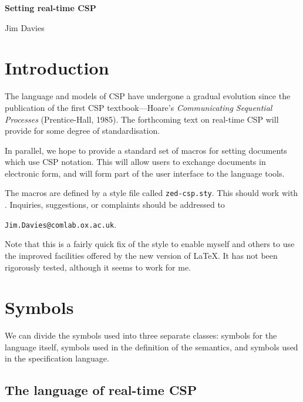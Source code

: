 \documentclass[12pt]{article}
\begin{document}
 \thispagestyle{empty}

\def\AMS{%
   $\cal{A}$
   \kern-.5em\lower.5ex\hbox{$\cal{M}$}\kern-.125em$\cal{S}$}

\parindent 0pt
\parskip 10pt

{\huge\bf Setting real-time CSP}

\vskip 2mm

{\Large Jim Davies}

\vskip 8mm


\section{Introduction}

The language and models of CSP have undergone a gradual evolution
since the publication of the first CSP textbook---Hoare's {\sl
Communicating Sequential Processes\/} (Prentice-Hall, 1985).  The
forthcoming text on real-time CSP will provide for some
degree of standardisation.  

In parallel, we hope to provide a standard set of macros for setting
documents which use CSP notation.  This will allow users to exchange
documents in electronic form, and will form part of the user interface
to the language tools.

The macros are defined by a style file called \verb|zed-csp.sty|.
This should work with \LaTeXe.  Inquiries, suggestions, or complaints
should be addressed to 

\begin{center}
  {\tt Jim.Davies@comlab.ox.ac.uk}.
\end{center}

Note that this is a fairly quick fix of the style to enable myself and
others to use the improved facilities offered by the new version of
\LaTeX.  It has not been rigorously tested, although it seems to work
for me.  

\section{Symbols}

We can divide the symbols used into three separate classes: symbols
for the language itself, symbols used in the definition of the
semantics, and symbols used in the specification language.  

\subsection{The language of real-time CSP}
\end{document}
